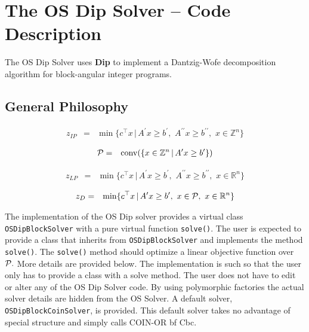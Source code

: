 \documentclass[11pt]{article}
\begin{document}
\section{The OS Dip Solver -- Code Description}\label{section:osdipsolver}

The OS Dip Solver uses {\bf Dip} to implement a Dantzig-Wofe decomposition
algorithm for block-angular integer programs. 

\subsection{General Philosophy}


\begin{eqnarray}
z_{IP} &=&  \min  \{c^{\top} x \, | \, A^{\prime} x \ge b^{\prime},  \,\, 
A^{\prime \prime} x \ge b^{\prime \prime}, \, \, x \in \mathbb{Z}^{n}  \}
\end{eqnarray}

\begin{eqnarray}
{\cal P} &=&  {\rm conv} ( \{ x \in \mathbb{Z}^{n} \, | \, A^{\prime} x \ge
b^{\prime}
\})
\end{eqnarray}


\begin{eqnarray}
z_{LP} &=&  \min  \{c^{\top} x \, | \, A^{\prime} x \ge b^{\prime},  \,\, 
A^{\prime \prime} x \ge b^{\prime \prime}, \, \, x \in \mathbb{R}^{n}  \}
\end{eqnarray}


\begin{eqnarray}
z_{D} &=&  \min  \{c^{\top} x \, | \, A^{\prime} x \ge b^{\prime},  \,\, 
x \in {\cal P}, \, \, x \in \mathbb{R}^{n}  \}
\end{eqnarray}

The implementation of the OS Dip solver provides a virtual class {\tt
OSDipBlockSolver} with a pure virtual function {\tt solve()}.  The user is
expected to provide a class that inherits from {\tt OSDipBlockSolver} and
implements the method {\tt solve()}.  The {\tt solve()} method should optimize a
linear objective function over ${\cal P}.$ More details are provided below. The
implementation is such so that the user only has to provide a class with a solve
method. The user does not have to edit or alter any of the OS Dip Solver code.
By using polymorphic factories the actual solver details are hidden from the OS
Solver.  A default solver, {\tt OSDipBlockCoinSolver}, is provided. This default
solver takes no advantage of special structure and simply calls COIN-OR {bf
Cbc.}
\end{document}
